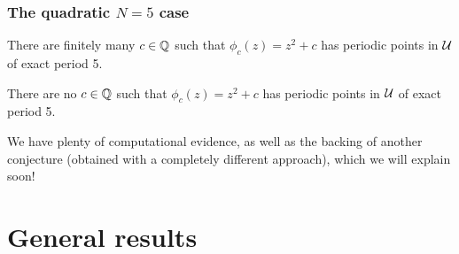 \documentclass[aspectratio=1610]{beamer}
\begin{document}
\begin{frame}
  \frametitle{The quadratic $N = 5$ case}

  \pause

  \begin{htheorem}
    There are finitely many $c \in \mathbb{Q}$ such that $\phi_c(z) = z^2 + c$
    has periodic points in $\mathcal{U}$ of exact period 5.
  \end{htheorem}

  \pause

  \begin{hconjecture}
    There are no $c \in \mathbb{Q}$ such that $\phi_c(z) = z^2 + c$ has
    periodic points in $\mathcal{U}$ of exact period 5.
  \end{hconjecture}

  We have plenty of computational evidence, as well as the backing of
  another conjecture (obtained with a completely different approach),
  which we will explain soon!
\end{frame}

\section{General results}

\newcommand{\nd}{\frac{N}{(N, d)}}
\end{document}
